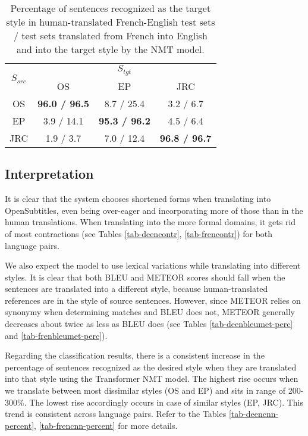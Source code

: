 \documentclass[11pt,a4paper]{article}
\begin{document}
\begin{table}[]
\centering
\begin{tabular}{|c|c|c|c|}
\hline
\multirow{2}{*}{$S_{src}$} & \multicolumn{3}{c|}{$S_{tgt}$}             \\ \cline{2-4} 
                        & OS          & EP          & JRC         \\ \hline
OS                      & \textbf{96.0 / 96.5} & 8.7 / 25.4  & 3.2 / 6.7   \\ \hline
EP                      & 3.9 / 14.1  & \textbf{95.3 / 96.2} & 4.5 / 6.4   \\ \hline
JRC                     & 1.9 / 3.7   & 7.0 / 12.4  & \textbf{96.8 / 96.7} \\ \hline
\end{tabular}
\caption{\small Percentage of sentences recognized as the target style in human-translated French-English test sets / test sets translated from French into English and into the target style by the NMT model.
      }
\label{tab-frencnn}
\end{table}

\subsection{Interpretation}

 It is clear that the system chooses shortened forms when translating into OpenSubtitles, even being over-eager and incorporating more of those than in the human translations. When translating into the more formal domains, it gets rid of most contractions (see Tables \ref{tab-deencontr}, \ref{tab-frencontr}) for both language pairs.
 
 We also expect the model to use lexical variations while translating into different styles. It is clear that both BLEU and METEOR scores should fall when the sentences are translated into a different style, because human-translated references are in the style of source sentences. However, since METEOR relies on synonymy when determining matches and BLEU does not, METEOR generally decreases about twice as less as BLEU does (see Tables \ref{tab-deenbleumet-perc} and \ref{tab-frenbleumet-perc}).
 
 Regarding the classification results, there is a consistent increase in the percentage of sentences recognized as the desired style when they are translated into that style using the Transformer NMT model. The highest rise occurs when we translate between most dissimilar styles (OS and EP) and sits in range of 200-300\%. The lowest rise accordingly occurs in case of similar styles (EP, JRC). This trend is consistent across language pairs. %
 Refer to the Tables \ref{tab-deencnn-percent}, \ref{tab-frencnn-percent} for more details. 
 
\end{document}
